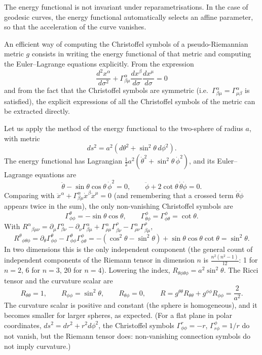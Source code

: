 \begin{points}
\item The energy functional is not invariant under reparametrisations. In the case of geodesic curves, the energy functional automatically selects an affine parameter, so that the acceleration of the curve vanishes.

\item An efficient way of computing the Christoffel symbols of a pseudo-Riemannian metric $g$ consists in writing the energy functional of that metric and computing the Euler--Lagrange equations explicitly. From the expression
\[
  \frac{d^2x^\alpha}{d\sigma^2}+\Gamma^\alpha_{\beta\mu}\frac{dx^\beta}{d\sigma}\frac{dx^\mu}{d\sigma}=0
\]
and from the fact that the Christoffel symbols are symmetric (i.e.\ $\Gamma^\alpha_{\beta\mu}=\Gamma^\alpha_{\mu\beta}$ is satisfied), the explicit expressions of all the Christoffel symbols of the metric can be extracted directly.
\end{points}

\begin{carroll}
Let us apply the method of the energy functional to the two-sphere of radius $a$, with metric
\[
  ds^2=a^2\left(d\theta^2+\sin^2\theta\,d\phi^2\right).
\]
The energy functional has Lagrangian $\frac12a^2(\dot\theta^2+\sin^2\theta\,\dot\phi^2)$, and its Euler--Lagrange equations are
\[
  \ddot\theta-\sin\theta\cos\theta\,\dot\phi^2=0,\qquad\ddot\phi+2\cot\theta\,\dot\theta\dot\phi=0 .
\]
Comparing with $\ddot x^\alpha+\Gamma^\alpha_{\beta\mu}\dot x^\beta\dot x^\mu=0$ (and remembering that a crossed term $\dot\theta\dot\phi$ appears twice in the sum), the only non-vanishing Christoffel symbols are
\[
  \Gamma^\theta_{\phi\phi}=-\sin\theta\cos\theta,\qquad\Gamma^\phi_{\theta\phi}=\Gamma^\phi_{\phi\theta}=\cot\theta .
\]
With $R^\alpha{}_{\beta\mu\nu}=\partial_\mu\Gamma^\alpha_{\beta\nu}-\partial_\nu\Gamma^\alpha_{\beta\mu}+\Gamma^\alpha_{\rho\mu}\Gamma^\rho_{\beta\nu}-\Gamma^\alpha_{\rho\nu}\Gamma^\rho_{\beta\mu}$,
\[
  R^\theta{}_{\phi\theta\phi}=\partial_\theta\Gamma^\theta_{\phi\phi}-\Gamma^\theta_{\phi\phi}\Gamma^\phi_{\phi\theta}=-(\cos^2\theta-\sin^2\theta)+\sin\theta\cos\theta\cot\theta=\sin^2\theta .
\]
In two dimensions this is the only independent component (the general count of independent components of the Riemann tensor in dimension $n$ is $\frac{n^2(n^2-1)}{12}$: 1 for $n=2$, 6 for $n=3$, 20 for $n=4$). Lowering the index, $R_{\theta\phi\theta\phi}=a^2\sin^2\theta$. The Ricci tensor and the curvature scalar are
\[
  R_{\theta\theta}=1,\qquad R_{\phi\phi}=\sin^2\theta,\qquad R_{\theta\phi}=0,\qquad R=g^{\theta\theta}R_{\theta\theta}+g^{\phi\phi}R_{\phi\phi}=\frac{2}{a^2}.
\]
The curvature scalar is positive and constant (the sphere is homogeneous), and it becomes smaller for larger spheres, as expected. (For a flat plane in polar coordinates, $ds^2=dr^2+r^2d\phi^2$, the Christoffel symbols $\Gamma^r_{\phi\phi}=-r$, $\Gamma^\phi_{r\phi}=1/r$ do not vanish, but the Riemann tensor does: non-vanishing connection symbols do not imply curvature.)
\end{carroll}


